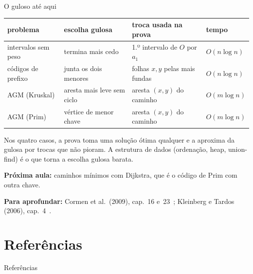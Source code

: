\documentclass[aspectratio=169,xcolor=table]{beamer}
\newcommand{\fonte}[1]{%
  \vfill
  {\tiny\color{gray!55!black}\textbf{Para aprofundar:} #1\par}%
}
\begin{document}
\begin{frame}{O guloso até aqui}
  \begin{center}
  \scriptsize
  \begin{tabular}{llll}
    \toprule
    problema & escolha gulosa & troca usada na prova & tempo \\
    \midrule
    intervalos sem peso & termina mais cedo & 1.º intervalo de $O$ por $a_1$ & $O(n \log n)$ \\
    códigos de prefixo & junta os dois menores & folhas $x, y$ pelas mais fundas & $O(n \log n)$ \\
    AGM (Kruskal) & aresta mais leve sem ciclo & aresta $(x,y)$ do caminho & $O(m \log n)$ \\
    AGM (Prim) & vértice de menor chave & aresta $(x,y)$ do caminho & $O(m \log n)$ \\
    \bottomrule
  \end{tabular}
  \end{center}
  \medskip
  {\scriptsize Nos quatro casos, a prova toma uma solução ótima qualquer e a aproxima da
  gulosa por trocas que não pioram. A estrutura de dados (ordenação, heap, union-find) é o que
  torna a escolha gulosa barata.\par}
  \smallskip
  {\scriptsize\textbf{Próxima aula:} caminhos mínimos com Dijkstra, que é o código de Prim com
  outra chave.\par}
  \fonte{Cormen et al.\ (2009), cap.~16 e~23~\cite{cormen2009introduction};
    Kleinberg e Tardos (2006), cap.~4~\cite{kleinberg2006algorithm}.}
\end{frame}

\section*{Referências}
\begin{frame}[allowframebreaks]{Referências}
  \tiny
  \nocite{cormen2009introduction,cormen2012algoritmos,kleinberg2006algorithm,levitin2012introduction,dasgupta2008algorithms,feofiloff2020grafos,sedgewick2011algorithms,kruskal1956shortest,prim1957shortest,tarjan1975efficiency,graham1985history,boruvka1926jistem,jarnik1930jistem,cayley1889theorem}
  
  
\end{frame}
\end{document}
